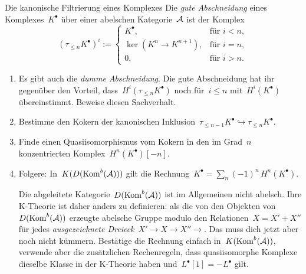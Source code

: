 \documentclass{uebblatt}
\begin{document}
\begin{aufgabe}{Die kanonische Filtrierung eines Komplexes}
Die \emph{gute Abschneidung} eines Komplexes~$K^\bullet$ über einer abelschen
Kategorie~$\mathcal{A}$ ist der Komplex
\[ (\tau_{\leq n} K^\bullet)^i := \begin{cases}
  K^\bullet, & \text{für $i < n$}, \\
  \ker(K^n \to K^{n+1}), & \text{für $i = n$}, \\
  0, & \text{für $i > n$}.
\end{cases} \]

\begin{enumerate}
\item Es gibt auch die \emph{dumme Abschneidung}. Die gute Abschneidung hat ihr
gegenüber den Vorteil, dass~$H^i(\tau_{\leq n} K^\bullet)$ noch für~$i \leq n$
mit~$H^i(K^\bullet)$ übereinstimmt. Beweise diesen Sachverhalt.
\item Bestimme den Kokern der kanonischen Inklusion~$\tau_{\leq n-1}K^\bullet
\hookrightarrow \tau_{\leq n}K^\bullet$.
\item Finde einen Quasiisomorphismus vom Kokern in den im Grad~$n$
konzentrierten Komplex~$H^n(K^\bullet)[-n]$.
\item Folgere: In~$K(D(\mathrm{Kom}^b(\mathcal{A})))$ gilt die
Rechnung~$K^\bullet = \sum_n (-1)^n\, H^n(K^\bullet)$.

{\scriptsize
Die abgeleitete Kategorie~$D(\mathrm{Kom}^b(\mathcal{A}))$ ist im Allgemeinen nicht abelsch.
Ihre K-Theorie ist daher anders zu definieren: als die von den Objekten
von~$D(\mathrm{Kom}^b(\mathcal{A}))$ erzeugte abelsche Gruppe modulo den Relationen~$X = X' +
X''$ für jedes \emph{ausgezeichnete Dreieck}~$X' \to X \to X'' \to$. Das muss dich
jetzt aber noch nicht kümmern. Bestätige die Rechnung einfach
in~$K(\mathrm{Kom}^b(\mathcal{A}))$, verwende aber die zusätzlichen Rechenregeln, dass
quasiisomorphe Komplexe dieselbe Klasse in der K-Theorie haben
und~$L^\bullet[1] = -L^\bullet$ gilt.
\par}
\end{enumerate}
\end{aufgabe}
\end{document}
